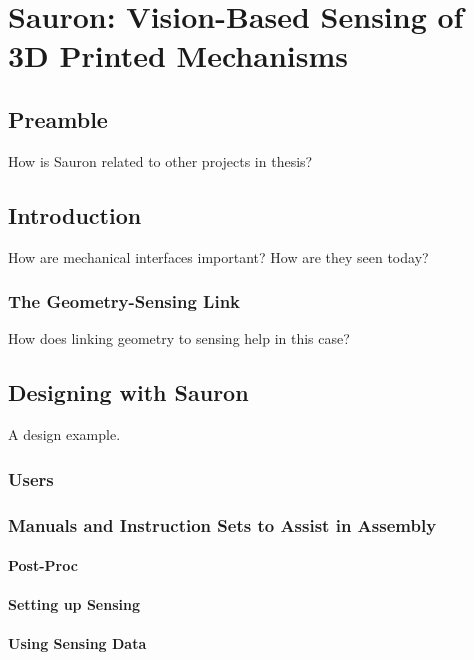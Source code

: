 \chapter{Sauron: Vision-Based Sensing of 3D Printed Mechanisms}

\section{Preamble}


How is Sauron related to other projects in thesis?

\section{Introduction}
How are mechanical interfaces important?  How are they seen today?

    \subsection{The Geometry-Sensing Link}
    How does linking geometry to sensing help in this case?

\section{Designing with Sauron}
    A design example.

    \subsection{Users}

    \subsection{Manuals and Instruction Sets to Assist in Assembly}

        \subsubsection{Post-Proc}

        \subsubsection{Setting up Sensing}

        \subsubsection{Using Sensing Data}


